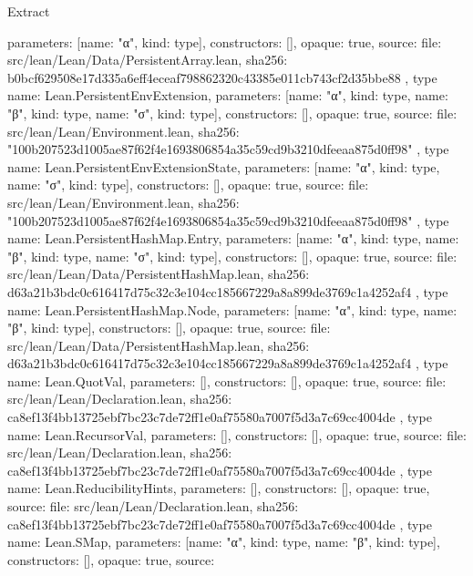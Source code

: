 \begin{lexlean}{Extract}
\begin{toolingmodule}
{{      parameters: [{name: "α", kind: type{}}],
      constructors: [],
      opaque: true,
      source: {
        file: src/lean/Lean/Data/PersistentArray.lean,
        sha256: b0bcf629508e17d335a6eff4eceaf798862320c43385e011cb743cf2d35bbe88
      }
    },
    type{
      name: Lean.PersistentEnvExtension,
      parameters: [{name: "α", kind: type{}}, {name: "β", kind: type{}}, {name: "σ", kind: type{}}],
      constructors: [],
      opaque: true,
      source: {
        file: src/lean/Lean/Environment.lean,
        sha256: "100b207523d1005ae87f62f4e1693806854a35c59cd9b3210dfeeaa875d0ff98"
      }
    },
    type{
      name: Lean.PersistentEnvExtensionState,
      parameters: [{name: "α", kind: type{}}, {name: "σ", kind: type{}}],
      constructors: [],
      opaque: true,
      source: {
        file: src/lean/Lean/Environment.lean,
        sha256: "100b207523d1005ae87f62f4e1693806854a35c59cd9b3210dfeeaa875d0ff98"
      }
    },
    type{
      name: Lean.PersistentHashMap.Entry,
      parameters: [{name: "α", kind: type{}}, {name: "β", kind: type{}}, {name: "σ", kind: type{}}],
      constructors: [],
      opaque: true,
      source: {
        file: src/lean/Lean/Data/PersistentHashMap.lean,
        sha256: d63a21b3bdc0c616417d75c32c3e104cc185667229a8a899de3769c1a4252af4
      }
    },
    type{
      name: Lean.PersistentHashMap.Node,
      parameters: [{name: "α", kind: type{}}, {name: "β", kind: type{}}],
      constructors: [],
      opaque: true,
      source: {
        file: src/lean/Lean/Data/PersistentHashMap.lean,
        sha256: d63a21b3bdc0c616417d75c32c3e104cc185667229a8a899de3769c1a4252af4
      }
    },
    type{
      name: Lean.QuotVal,
      parameters: [],
      constructors: [],
      opaque: true,
      source: {
        file: src/lean/Lean/Declaration.lean,
        sha256: ca8ef13f4bb13725ebf7bc23c7de72ff1e0af75580a7007f5d3a7c69cc4004de
      }
    },
    type{
      name: Lean.RecursorVal,
      parameters: [],
      constructors: [],
      opaque: true,
      source: {
        file: src/lean/Lean/Declaration.lean,
        sha256: ca8ef13f4bb13725ebf7bc23c7de72ff1e0af75580a7007f5d3a7c69cc4004de
      }
    },
    type{
      name: Lean.ReducibilityHints,
      parameters: [],
      constructors: [],
      opaque: true,
      source: {
        file: src/lean/Lean/Declaration.lean,
        sha256: ca8ef13f4bb13725ebf7bc23c7de72ff1e0af75580a7007f5d3a7c69cc4004de
      }
    },
    type{
      name: Lean.SMap,
      parameters: [{name: "α", kind: type{}}, {name: "β", kind: type{}}],
      constructors: [],
      opaque: true,
      source: {
}}}
\end{toolingmodule}
\end{lexlean}
